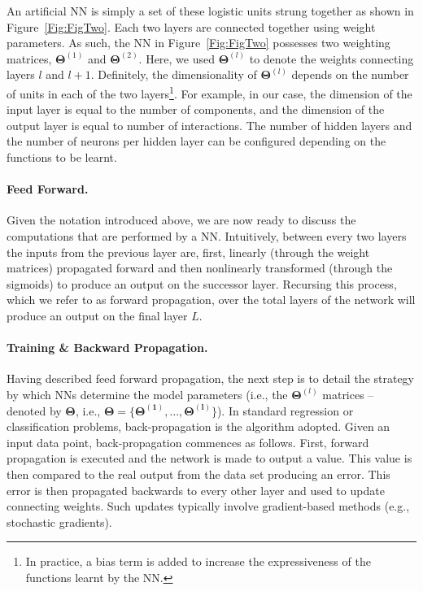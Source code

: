 An artificial NN is simply a set of these logistic units strung together as shown in Figure~\ref{Fig:FigTwo}. Each two layers are connected together using weight parameters. As such, the NN in Figure~\ref{Fig:FigTwo} possesses two weighting matrices, $\bm{\Theta}^{(1)}$ and $\bm{\Theta}^{(2)}$. Here, we used $\bm{\Theta}^{(l)}$ to denote the weights connecting layers $l$ and $l+1$. Definitely, the dimensionality of $\bm{\Theta}^{(l)}$ depends on the number of units in each of the two layers\footnote{
In practice, a bias term is added to increase the expressiveness of the functions learnt by the NN.}. 
For example, in our case, the dimension of the input layer is equal to the number of components, and the dimension of the output layer is equal to number of interactions. The number of hidden layers and the number of neurons per hidden layer can be configured depending on the functions to be learnt. 
%

\paragraph{Feed Forward.}
Given the notation introduced above, we are now ready to discuss the computations that are performed by a NN. Intuitively, between every two layers the inputs from the previous layer are, first, linearly (through the weight matrices) propagated forward and then nonlinearly transformed (through the sigmoids) to produce an output on the successor layer. Recursing this process, which we refer to as forward propagation, over the total layers of the network will produce an output on the final layer $L$. 
%
\vspace*{-0.3cm}
\paragraph{Training \& Backward Propagation.} Having described feed forward propagation, the next step is to detail the strategy by which NNs determine the model parameters (i.e., the $\bm{\Theta}^{(l)}$ matrices -- denoted by $\bm{\Theta}$, i.e., $\bm{\Theta} = \{\bm{\Theta^{(1)}}, \dots, \bm{\Theta^{(l)}}\}$). In standard regression or classification problems, back-propagation is the algorithm adopted. Given an input data point, back-propagation commences as follows. First, forward propagation is executed and the network is made to output a value. This value is then compared to the real output from the data set producing an error. This error is then propagated backwards to every other layer and used to update connecting weights. Such updates typically involve gradient-based methods (e.g., stochastic gradients). 
